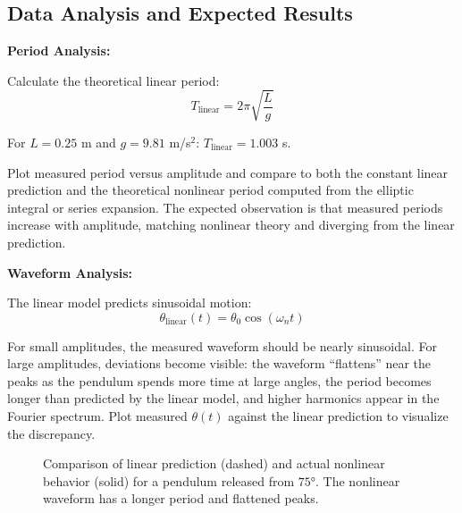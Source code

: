\subsection{Data Analysis and Expected Results}

\textbf{Period Analysis:}

Calculate the theoretical linear period:
\begin{equation}
T_{\text{linear}} = 2\pi\sqrt{\frac{L}{g}}
\end{equation}

For $L = 0.25$ m and $g = 9.81$ m/s$^2$: $T_{\text{linear}} = 1.003$ s.

Plot measured period versus amplitude and compare to both the constant linear prediction and the theoretical nonlinear period computed from the elliptic integral or series expansion. The expected observation is that measured periods increase with amplitude, matching nonlinear theory and diverging from the linear prediction.

\textbf{Waveform Analysis:}

The linear model predicts sinusoidal motion:
\begin{equation}
\theta_{\text{linear}}(t) = \theta_0 \cos(\omega_n t)
\end{equation}

For small amplitudes, the measured waveform should be nearly sinusoidal. For large amplitudes, deviations become visible: the waveform ``flattens'' near the peaks as the pendulum spends more time at large angles, the period becomes longer than predicted by the linear model, and higher harmonics appear in the Fourier spectrum. Plot measured $\theta(t)$ against the linear prediction to visualize the discrepancy.

\begin{figure}[htbp]
\centering
{}
\caption{Comparison of linear prediction (dashed) and actual nonlinear behavior (solid) for a pendulum released from $75°$. The nonlinear waveform has a longer period and flattened peaks.}
\label{fig:waveform_comparison}
\end{figure}

